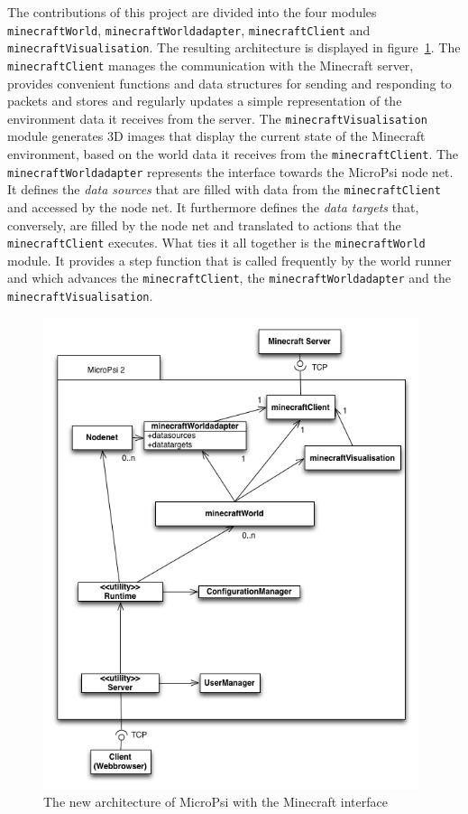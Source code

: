 
The contributions of this project are divided into the four modules \texttt{minecraftWorld}, \texttt{minecraftWorldadapter}, \texttt{minecraftClient} and \texttt{minecraftVisualisation}. The resulting architecture is displayed in figure~\ref{uml_mc}. The \texttt{minecraftClient} manages the communication with the Minecraft server, provides convenient functions and data structures for sending and responding to packets and stores and regularly updates a simple representation of the environment data it receives from the server. The \texttt{minecraftVisualisation} module generates 3D images that display the current state of the Minecraft environment, based on the world data it receives from the \texttt{minecraftClient}. The \texttt{minecraftWorldadapter} represents the interface towards the MicroPsi node net. It defines the \emph{data sources} that are filled with data from the \texttt{minecraftClient} and accessed by the node net. It furthermore defines the \emph{data targets} that, conversely, are filled by the node net and translated to actions that the \texttt{minecraftClient} executes. What ties it all together is the \texttt{minecraftWorld} module. It provides a step function that is called frequently by the world runner and which advances the \texttt{minecraftClient}, the \texttt{minecraftWorldadapter} and the \texttt{minecraftVisualisation}.


\begin{figure}[h]
  \centering
    \includegraphics[width=11cm]{graphics/UML_MicroPsi_mit_spock_v13}
  \caption{The new architecture of MicroPsi with the Minecraft interface}
  \label{uml_mc}
\end{figure}

